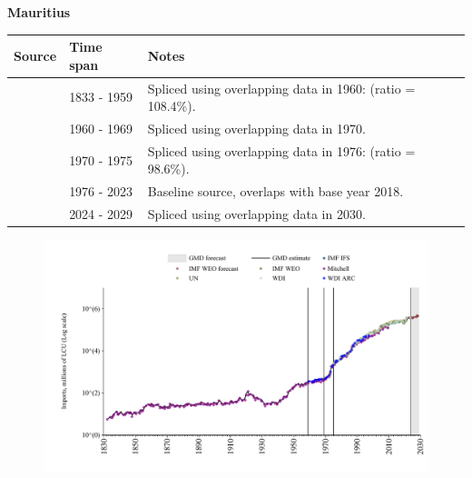 \documentclass[12pt,a4paper,landscape]{article}
\begin{document}
\begin{adjustbox}{max totalsize={\paperwidth}{\paperheight},center}
\begin{minipage}[t][\textheight][t]{\textwidth}
\vspace*{0.5cm}
{}
\begin{center}
{\Large\bfseries Mauritius}
\end{center}
\vspace{0.5cm}
\begin{table}[H]
\centering
\small
\begin{tabular}{|l|l|l|}
\hline
\textbf{Source} & \textbf{Time span} & \textbf{Notes} \\
\hline
\rowcolor{white}\cite{Mitchell}& 1833 - 1959 &Spliced using overlapping data in 1960: (ratio = 108.4\%).\\
\rowcolor{lightgray}\cite{WDI_ARC}& 1960 - 1969 &Spliced using overlapping data in 1970.\\
\rowcolor{white}\cite{UN}& 1970 - 1975 &Spliced using overlapping data in 1976: (ratio = 98.6\%).\\
\rowcolor{lightgray}\cite{WDI}& 1976 - 2023 &Baseline source, overlaps with base year 2018.\\
\rowcolor{white}\cite{IMF_WEO_forecast}& 2024 - 2029 &Spliced using overlapping data in 2030.\\
\hline
\end{tabular}
\end{table}
\begin{figure}[H]
\centering
\includegraphics[width=\textwidth,height=0.6\textheight,keepaspectratio]{graphs/MUS_imports.pdf}
\end{figure}
\end{minipage}
\end{adjustbox}
\end{document}
